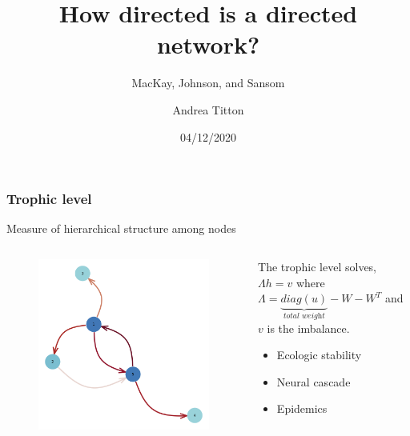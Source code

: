 \documentclass{beamer}
\title{How directed is a directed network?}
\subtitle{MacKay, Johnson, and Sansom}
\author{Andrea Titton}
\institute{Tinbergen Institute}
\date{04/12/2020}
\begin{document}
\frame{\titlepage}
\nocite{*}

\begin{frame}
    \frametitle{Trophic level}
    Measure of hierarchical structure among nodes
    \begin{columns}
        \begin{column}{.49\textwidth}
            \begin{figure}
                \includegraphics[width=0.8\linewidth,height=0.8\textheight,keepaspectratio]{../../plots/presentations/lv-network.png}
            \end{figure}
        \end{column}
        \begin{column}{.48\textwidth}
            The trophic level solves,
            $\Lambda h = v$ where
            $\Lambda = \underbrace{diag(u)}_{\textit{total weight}} - W - W^T$
            and $v$ is the imbalance.
            \hspace{2\unitlength}
            \begin{itemize}
                \item Ecologic stability
                \item Neural cascade
                \item Epidemics
            \end{itemize}
        \end{column}
    \end{columns}
\end{frame}
\end{document}
